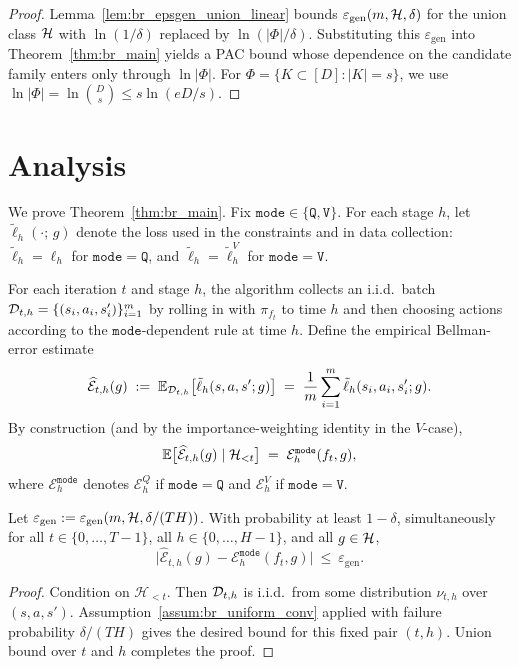 \begin{proof}
Lemma~\ref{lem:br_epsgen_union_linear} bounds $\varepsilon_{\mathrm{gen}}(m,\mathcal{H},\delta)$ for the union
class $\mathcal{H}$ with $\ln(1/\delta)$ replaced by $\ln(|\Phi|/\delta)$.
Substituting this $\varepsilon_{\mathrm{gen}}$ into Theorem~\ref{thm:br_main} yields a PAC bound whose
dependence on the candidate family enters only through $\ln|\Phi|$.  For $\Phi=\{K\subset[D]:|K|=s\}$,
we use $\ln|\Phi|=\ln\binom{D}{s}\le s\ln(eD/s)$.
\end{proof}

\section{Analysis}
\label{subsec:br_analysis}

We prove Theorem~\ref{thm:br_main}. Fix $\mathtt{mode}\in\{\mathtt{Q},\mathtt{V}\}$.
For each stage $h$, let $\tilde{\ell}_h(\cdot;\,g)$ denote the loss used in the constraints and in
data collection: $\tilde{\ell}_h=\ell_h$ for $\mathtt{mode}=\mathtt{Q}$, and
$\tilde{\ell}_h=\tilde{\ell}_h^V$ for $\mathtt{mode}=\mathtt{V}$.

For each iteration $t$ and stage $h$, the algorithm collects an i.i.d.\ batch
$\mathcal{D}_{t,h}=\{(s_i,a_i,s_i')\}_{i=1}^m$ by rolling in with $\pi_{f_t}$ to time $h$ and then choosing
actions according to the $\mathtt{mode}$-dependent rule at time $h$.
Define the empirical Bellman-error estimate
\[
\widehat{\mathcal{E}}_{t,h}(g)
\;:=\;
\mathbb{E}_{\mathcal{D}_{t,h}}\big[\tilde{\ell}_h(s,a,s';g)\big]
\;=\;
\frac{1}{m}\sum_{i=1}^m \tilde{\ell}_h(s_i,a_i,s_i';g).
\]
By construction (and by the importance-weighting identity in the $V$-case),
\[
\mathbb{E}\big[\widehat{\mathcal{E}}_{t,h}(g)\mid \mathcal{H}_{<t}\big]
\;=\;
\mathcal{E}^{\mathtt{mode}}_h(f_t,g),
\]
where $\mathcal{E}^{\mathtt{mode}}_h$ denotes $\mathcal{E}^Q_h$ if $\mathtt{mode}=\mathtt{Q}$ and
$\mathcal{E}^V_h$ if $\mathtt{mode}=\mathtt{V}$.

\begin{lemma}
\label{lem:br_good_event}
Let $\varepsilon_{\mathrm{gen}}:=\varepsilon_{\mathrm{gen}}(m,\mathcal{H},\delta/(TH))$.
With probability at least $1-\delta$, simultaneously for all $t\in\{0,\dots,T-1\}$, all
$h\in\{0,\dots,H-1\}$, and all $g\in\mathcal{H}$,
\[
\big|\widehat{\mathcal{E}}_{t,h}(g)-\mathcal{E}^{\mathtt{mode}}_h(f_t,g)\big|
\ \le\ 
\varepsilon_{\mathrm{gen}}.
\]
\end{lemma}

\begin{proof}
Condition on $\mathcal{H}_{<t}$. Then $\mathcal{D}_{t,h}$ is i.i.d.\ from some distribution $\nu_{t,h}$
over $(s,a,s')$. Assumption~\ref{assum:br_uniform_conv} applied with failure probability $\delta/(TH)$
gives the desired bound for this fixed pair $(t,h)$. Union bound over $t$ and $h$ completes the proof.
\end{proof}

